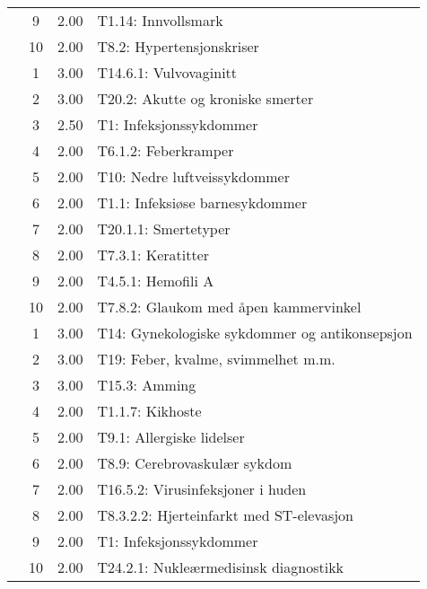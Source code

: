 \begin{table}[htbp]
\begin{tabular}{c c c l}
     & 9 & 2.00 & T1.14: Innvollsmark \\
     & 10 & 2.00 & T8.2: Hypertensjonskriser \\
	\addlinespace
    3 & 1 & 3.00 & T14.6.1: Vulvovaginitt \\
     & 2 & 3.00 & T20.2: Akutte og kroniske smerter \\
     & 3 & 2.50 & T1: Infeksjonssykdommer \\
     & 4 & 2.00 & T6.1.2: Feberkramper \\
     & 5 & 2.00 & T10: Nedre luftveissykdommer \\
     & 6 & 2.00 & T1.1: Infeksiøse barnesykdommer \\
     & 7 & 2.00 & T20.1.1: Smertetyper \\
     & 8 & 2.00 & T7.3.1: Keratitter \\
     & 9 & 2.00 & T4.5.1: Hemofili A \\%
     & 10 & 2.00 & T7.8.2: Glaukom med åpen kammervinkel \\
	\addlinespace
    4 & 1 & 3.00 & T14: Gynekologiske sykdommer og antikonsepsjon \\
     & 2 & 3.00 & T19: Feber, kvalme, svimmelhet m.m. \\
     & 3 & 3.00 & T15.3: Amming \\
     & 4 & 2.00 & T1.1.7: Kikhoste \\
     & 5 & 2.00 & T9.1: Allergiske lidelser \\
     & 6 & 2.00 & T8.9: Cerebrovaskulær sykdom \\
     & 7 & 2.00 & T16.5.2: Virusinfeksjoner i huden \\
     & 8 & 2.00 & T8.3.2.2: Hjerteinfarkt med ST-elevasjon \\
     & 9 & 2.00 & T1: Infeksjonssykdommer \\
     & 10 & 2.00 & T24.2.1: Nukleærmedisinsk diagnostikk \\
	\bottomrule
\end{tabular}
\end{table}

